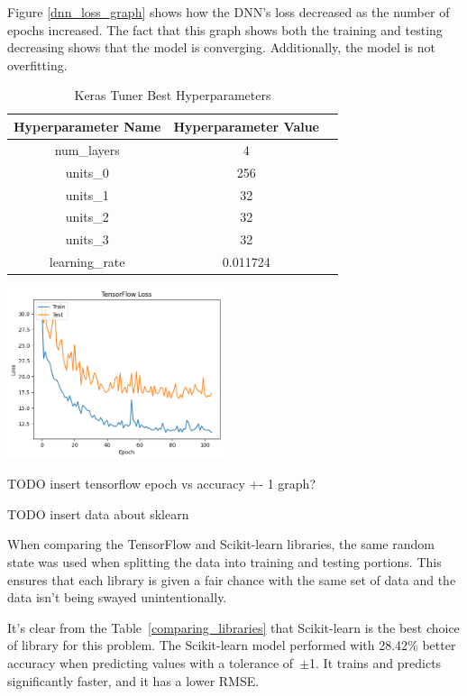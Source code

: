 \documentclass[lettersize,journal]{IEEEtran}
\newenvironment{Figure}
    {\par\medskip\noindent\minipage{\linewidth}}
    {\endminipage\par\medskip}
\begin{document}
Figure \ref{dnn_loss_graph} shows how the DNN's loss decreased as the number of epochs increased. The fact that this graph shows both the training and testing decreasing shows that the model is converging. Additionally, the model is not overfitting. 

\begin{table}[h]
\caption{Keras Tuner Best Hyperparameters}
\begin{center}
\begin{tabular}{ |c|c|c| }
    \hline
    Hyperparameter Name & Hyperparameter Value \\ 
    \hline
    num\_layers & 4 \\  
    \hline
    units\_0 & 256 \\
    \hline
    units\_1 & 32 \\
    \hline
    units\_2 & 32 \\
    \hline
    units\_3 & 32 \\
    \hline
    learning\_rate & 0.011724 \\
    \hline
\end{tabular}
\end{center}
\label{keras_best_params}
\end{table}

\begin{Figure}
    \centering
    \includegraphics[width=2.5in]{loss}
    \label{dnn_loss_graph}
\end{Figure}

TODO insert tensorflow epoch vs accuracy +- 1 graph? 

TODO insert data about sklearn 

When comparing the TensorFlow and Scikit-learn libraries, the same random state was used when splitting the data into training and testing portions. This ensures that each library is given a fair chance with the same set of data and the data isn't being swayed unintentionally. 

It's clear from the Table~\ref{comparing_libraries} that Scikit-learn is the best choice of library for this problem. The Scikit-learn model performed with 28.42\% better accuracy when predicting values with a tolerance of~$\pm$1. It trains and predicts significantly faster, and it has a lower RMSE.
\end{document}
